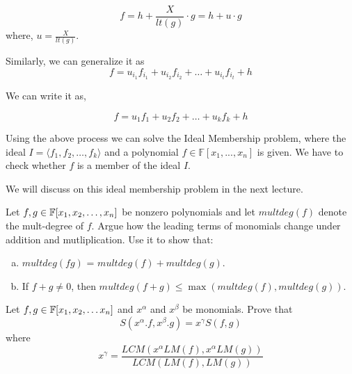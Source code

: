 $$ f = h + \frac{X}{lt(g)}\cdot g  = h + u\cdot g$$ where, $u = \frac{X}{lt(g)}$.

Similarly, we can generalize it as
$$ f = u_{i_1}f_{i_1} + u_{i_2}f_{i_2} + \ldots + u_{i_t}f_{i_t} + h $$

We can write it as,

$$ f = u_1f_1 + u_2f_2 + \ldots + u_kf_k + h $$

\begin{observation}
Using the above process we can solve the Ideal Membership problem, where the ideal $ I = \langle f_1,f_2, \ldots ,f_k \rangle$ and a polynomial $f \in \mathbb{F}[x_1,...,x_n]$ is given. We have to check whether $f$ is a member of the ideal $I$.

\end{observation}


We will discuss on this ideal membership problem in the next lecture.

 \begin{exercise}
Let $f,g \in {\mathbb{F}}[x_1, x_2, \ldots, x_n]$ be nonzero polynomials and let $multdeg(f)$ denote the mult-degree of $f$. Argue how the leading terms of monomials change under addition and mutliplication. Use it to show that:
\begin{enumerate}[(a)]
\item $multdeg(fg)$ = $multdeg(f)+multdeg(g)$.
\item If $f+g \ne 0$, then $multdeg(f+g) \le \max(multdeg(f),multdeg(g))$.
\end{enumerate}
\end{exercise}


\begin{exercise}
Let $f, g \in {\mathbb{F}}[x_1, x_2, \ldots x_n]$ and $x^\alpha$ and $x^\beta$ be monomials. Prove that 
\[ S(x^\alpha.f,x^\beta.g) = x^\gamma S(f,g) \]
where
\[ x^\gamma = \frac{LCM(x^\alpha LM(f),x^\alpha LM(g))}{LCM(LM(f),LM(g))} \]
\end{exercise}


